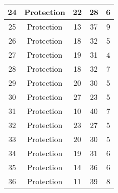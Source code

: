 \documentclass[results.tex]{subfiles}
\begin{document}
\begin{center}
\begin{tabular}{| c || c | c | c | c |}
            \hline
            24                      & Protection                   & 22                     & 28                      & 6                    \\
            \hline
            25                      & Protection                   & 13                     & 37                      & 9                    \\
            \hline
            26                      & Protection                   & 18                     & 32                      & 5                    \\
            \hline
            27                      & Protection                   & 19                     & 31                      & 4                    \\
            \hline
            28                      & Protection                   & 18                     & 32                      & 7                    \\
            \hline
            29                      & Protection                   & 20                     & 30                      & 5                    \\
            \hline
            30                      & Protection                   & 27                     & 23                      & 5                    \\
            \hline
            31                      & Protection                   & 10                     & 40                      & 7                    \\
            \hline
            32                      & Protection                   & 23                     & 27                      & 5                    \\
            \hline
            33                      & Protection                   & 20                     & 30                      & 5                    \\
            \hline
            34                      & Protection                   & 19                     & 31                      & 6                    \\
            \hline
            35                      & Protection                   & 14                     & 36                      & 6                    \\
            \hline
            36                      & Protection                   & 11                     & 39                      & 8                    \\

\end{tabular}
\end{center}
\end{document}
